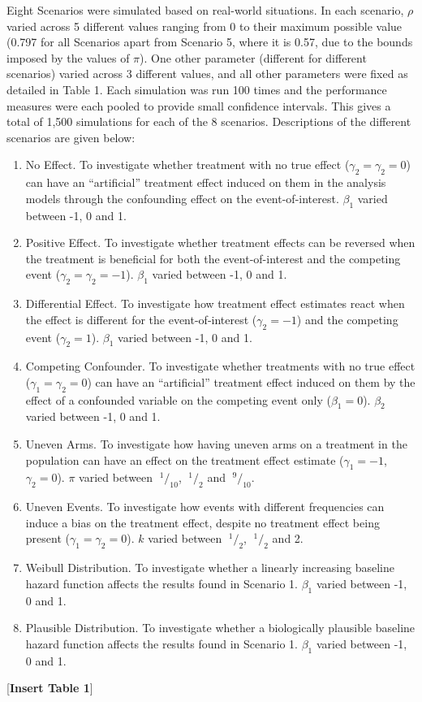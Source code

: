 \documentclass[12pt,PhD,twoside,openright]{muthesis}
\newcommand{\sfrac}[2]{\;^{#1}/_{#2}}
\begin{document}
Eight Scenarios were simulated based on real-world situations. In each scenario, \(\rho\) varied across 5 different values ranging from 0 to their maximum possible value (0.797 for all Scenarios apart from Scenario 5, where it is 0.57, due to the bounds imposed by the values of \(\pi\)). One other parameter (different for different scenarios) varied across 3 different values, and all other parameters were fixed as detailed in Table 1. Each simulation was run 100 times and the performance measures were each pooled to provide small confidence intervals. This gives a total of 1,500 simulations for each of the 8 scenarios. Descriptions of the different scenarios are given below:
\begin{enumerate}
\def\labelenumi{\arabic{enumi}.}
\item
  No Effect. To investigate whether treatment with no true effect (\(\gamma_2=\gamma_2=0\)) can have an ``artificial'' treatment effect induced on them in the analysis models through the confounding effect on the event-of-interest. \(\beta_1\) varied between -1, 0 and 1.
\item
  Positive Effect. To investigate whether treatment effects can be reversed when the treatment is beneficial for both the event-of-interest and the competing event (\(\gamma_2=\gamma_2=-1\)). \(\beta_1\) varied between -1, 0 and 1.
\item
  Differential Effect. To investigate how treatment effect estimates react when the effect is different for the event-of-interest (\(\gamma_2=-1\)) and the competing event (\(\gamma_2=1\)). \(\beta_1\) varied between -1, 0 and 1.
\item
  Competing Confounder. To investigate whether treatments with no true effect (\(\gamma_1=\gamma_2=0\)) can have an ``artificial'' treatment effect induced on them by the effect of a confounded variable on the competing event only (\(\beta_1=0\)). \(\beta_2\) varied between -1, 0 and 1.
\item
  Uneven Arms. To investigate how having uneven arms on a treatment in the population can have an effect on the treatment effect estimate (\(\gamma_1=-1\), \(\gamma_2=0\)). \(\pi\) varied between \(\sfrac{1}{10}\), \(\sfrac{1}{2}\) and \(\sfrac{9}{10}\).
\item
  Uneven Events. To investigate how events with different frequencies can induce a bias on the treatment effect, despite no treatment effect being present (\(\gamma_1=\gamma_2=0\)). \(k\) varied between \(\sfrac{1}{2}\), \(\sfrac{1}{2}\) and 2.
\item
  Weibull Distribution. To investigate whether a linearly increasing baseline hazard function affects the results found in Scenario 1. \(\beta_1\) varied between -1, 0 and 1.
\item
  Plausible Distribution. To investigate whether a biologically plausible baseline hazard function affects the results found in Scenario 1. \(\beta_1\) varied between -1, 0 and 1.
\end{enumerate}
{[}\textbf{Insert Table 1}{]}
\end{document}
